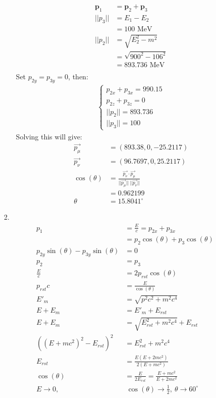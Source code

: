 \documentclass{article}
\begin{document}
\begin{itemize}
\begin{itemize}
\begin{align*}
            \mathbf{p}_1&=\mathbf{p}_2+\mathbf{p}_3\\
            ||p_3||&=E_1-E_2\\
            &=100 \text { MeV}\\
            ||p_2||&=\sqrt{E_2^2-m^2}\\
            &= \sqrt{900^2-106^2}\\
            &=893.736 \text{ MeV}\\
        \end{align*}
        Set \(p_{2y}=p_{3y}=0\), then:
        \begin{align*}
            \left\{\begin{matrix}
                p_{2x}+p_{3x}=990.15\\
                p_{2z}+p_{3z}=0\\
                ||p_2||=893.736\\
                ||p_3||=100
            \end{matrix}\right.
        \end{align*}
        Solving this will give:
        \begin{align*}
            \overrightarrow{p_\mu}&=(893.38,0,-25.2117)\\
            \overrightarrow{p_\nu}&=(96.7697,0,25.2117)\\
            \cos(\theta)&= \frac{\overrightarrow{p_\nu}\cdot\overrightarrow{p_\mu}}{||\overrightarrow{p_\mu}|| \ ||\overrightarrow{p_\nu}||}\\
            &=0.962199\\
            \theta &=15.8041 ^\circ
        \end{align*}
    \end{itemize}
    \newpage
    \item [2.] 
    \begin{align*}
        p_1 &=\frac{E}{c} = p_{2x}+p_{3x}\\
        &=p_2\cos(\theta)+p_3\cos(\theta)\\
        p_{2y}\sin(\theta)-p_{3y}\sin(\theta)&=0\\
        p_2&=p_3\\
        \frac{E}{c}&=2p_{rst}\cos(\theta)\\
        p_{rst}c&=\frac{E}{\cos(\theta)}\\
        E'_{m}&=\sqrt{p^2c^2+m^2c^4}\\
        E+E_m&=E'_m+E_{rst}\\
        E+E_m&=\sqrt{E_{rst}^2+m^2c^4}+E_{rst}\\
        ((E+mc^2)^2-E_{rst})^2&=E_{rst}^2+m^2c^4\\
        E_{rst}&=\frac{E(E+2mc^2)}{2(E+mc^2)}\\
        \cos(\theta)&=\frac{E}{2E_{rst}}=\frac{E+mc^2}{E+2mc^2}\\
        E\rightarrow 0, &\ \cos(\theta)\rightarrow \frac{1}{2},\ \theta \rightarrow 60^\circ
    \end{align*}
\end{itemize}
\end{document}
